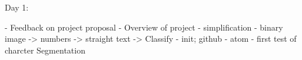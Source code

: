 Day 1:

- Feedback on project proposal
- Overview of project
  - simplification
    - binary image -> numbers -> straight text -> Classify
- init; github - atom
- first test of charcter Segmentation
